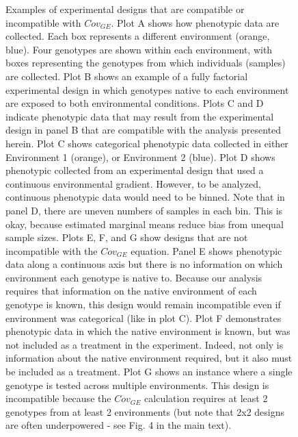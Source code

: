 \documentclass[11pt, oneside]{amsart}
\begin{document}
\begin{figure}[h]
\caption[Examples of experimental designs that are compatible or incompatible with $Cov_{GE}$.]{Examples of experimental designs that are compatible or incompatible with $Cov_{GE}$. Plot A shows how phenotypic data are collected. Each box represents a different environment (orange, blue). Four genotypes are shown within each environment, with boxes representing the genotypes from which individuals (samples) are collected. Plot B shows an example of a fully factorial experimental design in which genotypes native to each environment are exposed to both environmental conditions. Plots C and D indicate phenotypic data that may result from the experimental design in panel B that are compatible with the analysis presented herein. Plot C shows categorical phenotypic data collected in either Environment 1 (orange), or Environment 2 (blue). Plot D shows phenotypic collected from an experimental design that used a continuous environmental gradient. However, to be analyzed, continuous phenotypic data would need to be binned. Note that in panel D, there are uneven numbers of samples in each bin. This is okay, because estimated marginal means reduce bias from unequal sample sizes. Plots E, F, and G show designs that are not incompatible with the $Cov_{GE}$ equation. Panel E shows phenotypic data along a continuous axis but there is no information on which environment each genotype is native to. Because our analysis requires that information on the native environment of each genotype is known, this design would remain incompatible even if environment was categorical (like in plot C). Plot F demonstrates phenotypic data in which the native environment is known, but was not included as a treatment in the experiment. Indeed, not only is information about the native environment required, but it also must be included as a treatment. Plot G shows an instance where a single genotype is tested across multiple environments. This design is incompatible because the $Cov_{GE}$ calculation requires at least 2 genotypes from at least 2 environments (but note that 2x2 designs are often underpowered - see Fig. 4 in the main text). }
\end{figure}

\clearpage
\newpage

\renewcommand{\figurename}{Supplementary Figure}
\end{document}
